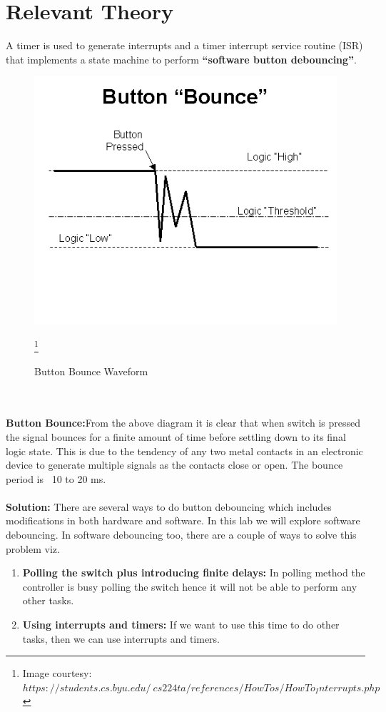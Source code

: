 \documentclass[a4paper,12pt,oneside]{book}
\begin{document}
\section {Relevant Theory}
A timer is used to generate interrupts and a timer interrupt service routine (ISR) that implements a state machine to perform \textbf{“software button debouncing”}.
\begin{figure}
\centering
\includegraphics[scale=0.8]{bounce.PNG}
\caption{Button Bounce Waveform}
\footnote{Image courtesy: $https://students.cs.byu.edu/~cs224ta/references/HowTos/HowTo_Interrupts.php$}
\end{figure}
\\
\\
\textbf{Button Bounce:}From the above diagram it is clear that when switch is pressed the signal bounces for a finite amount of time before settling down to its final logic state. This is due to the tendency of any two metal contacts in an electronic device to generate multiple signals as the contacts close or open. The bounce period is ~10 to 20 ms. 
\\
\\
\textbf{Solution: }There are several ways to do button debouncing which includes modifications in both hardware and software. In this lab we will explore software debouncing. In software debouncing too, there are a couple of ways to solve this problem viz. 
\begin{enumerate}
\item  \textbf{Polling the switch plus introducing finite delays:} 
In polling method the controller is busy polling the switch hence it will not be able to perform any other tasks.
\item \textbf{Using interrupts and timers:} If we want to use this time to do other tasks, then we can use interrupts and timers. \\ 
\end{enumerate}
\end{document}
